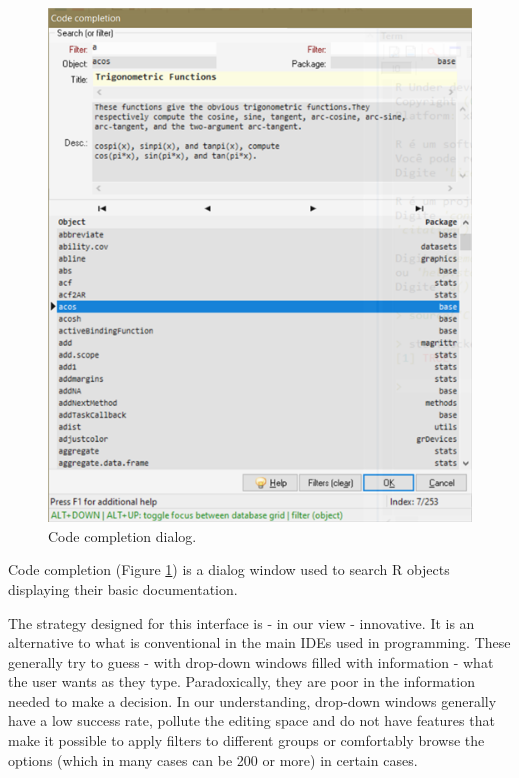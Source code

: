 \begin{figure}[H]
  \begin{center}
    \includegraphics[scale=0.60]{./res/dlg_code_completion.png}
  \end{center}
  \caption{Code completion dialog.}
  \label{fig:dlg_tinn-r_code_completion}
\end{figure}
Code completion
(Figure \ref{fig:dlg_tinn-r_code_completion})
is a dialog window used to search R objects displaying their basic documentation.

The strategy designed for this interface is - in our view - innovative. It is an alternative to what
is conventional in the main IDEs used in programming. These generally try to
guess - with drop-down windows filled with information - what the user wants as they type.
Paradoxically, they are poor in the information needed to make a decision.
In our understanding, drop-down windows generally have a low success rate,
pollute the editing space and do not have features that make it possible to apply filters to
different groups or comfortably browse the options (which in many cases can be 200 or more) in certain cases.

